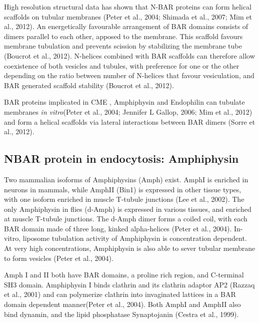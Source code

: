 	\vspace{5mm}
High resolution structural data has shown that N-BAR proteins can form helical scaffolds on tubular membranes (Peter et al., 2004; Shimada et al., 2007; Mim et al., 2012). An energetically favourable arrangement of BAR domains consists of dimers parallel to each other, apposed to the membrane. This scaffold favours membrane tubulation and prevents scission by stabilizing the membrane tube (Boucrot et al., 2012). N-helices combined with BAR scaffolds can therefore allow coexistence of both vesicles and tubules, with preference for one or the other depending on the ratio between number of N-helices that favour vesiculation, and BAR generated scaffold stability (Boucrot et al., 2012). 



	\vspace{5mm}
BAR proteins implicated in CME , Amphiphysin and Endophilin can tubulate membranes \textit{in vitro}(Peter et al., 2004; Jennifer L Gallop, 2006; Mim et al., 2012) and form a helical scaffolds via lateral interactions between BAR dimers (Sorre et al., 2012). 



	\subsection{NBAR protein in endocytosis: Amphiphysin }		
Two mammalian isoforms of Amphiphysins (Amph) exist. AmphI is enriched in neurons in mammals, while AmphII (Bin1) is expressed in other tissue types, with one isoform enriched in muscle T-tubule junctions (Lee et al., 2002). The only Amphiphysin in flies (d-Amph) is expressed in various tissues, and enriched at muscle T-tubule junctions. The d-Amph dimer forms a coiled coil, with each BAR domain made of three long, kinked alpha-helices (Peter et al., 2004). In-vitro, liposome tubulation activity of Amphiphysin is concentration dependent. At very high concentrations, Amphiphysin is also able to sever tubular membrane to form vesicles (Peter et al., 2004). 

	\vspace{5mm}
Amph I and II both have BAR domains, a proline rich region, and C-terminal SH3 domain.
Amphiphysin I binds clathrin and its clathrin adaptor AP2 (Razzaq et al., 2001) and can polymerize clathrin into invaginated lattices in a BAR domain dependent manner(Peter et al., 2004). Both AmphI and AmphII also bind dynamin, and the lipid phosphatase Synaptojanin (Cestra et al., 1999).




